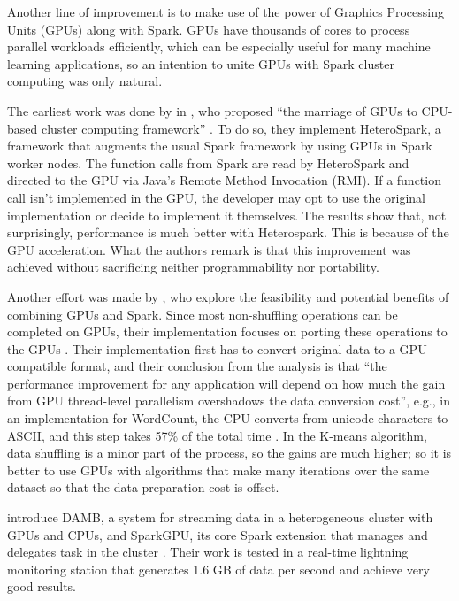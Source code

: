 \documentclass{article}
\begin{document}
Another line of improvement is to make use of the power of Graphics Processing Units (GPUs) along with Spark. GPUs have thousands of cores to process parallel workloads efficiently, which can be especially useful for many machine learning applications, so an intention to unite GPUs with Spark cluster computing was only natural.

The earliest work was done by \citeauthor{Li2015} in \citeyear{Li2015}, who proposed ``the marriage of GPUs to CPU-based cluster computing framework'' \cite{Li2015}. To do so, they implement HeteroSpark, a framework that augments the usual Spark framework by using GPUs in Spark worker nodes. The function calls from Spark are read by HeteroSpark and directed to the GPU via Java's Remote Method Invocation (RMI). If a function call isn't implemented in the GPU, the developer may opt to use the original implementation or decide to implement it themselves. The results show that, not surprisingly, performance is much better with Heterospark. This is because of the GPU acceleration. What the authors remark is that this improvement was achieved without sacrificing neither programmability nor portability.

Another effort was made by \citeauthor{Manzi2016}, who explore the feasibility and potential benefits of combining GPUs and Spark. Since most non-shuffling operations can be completed on GPUs, their implementation focuses on porting these operations to the GPUs \cite{Manzi2016}. Their implementation first has to convert original data to a GPU-compatible format, and their conclusion from the analysis is that ``the performance improvement for any application will depend on how much the gain from GPU thread-level parallelism overshadows the data conversion cost'', e.g., in an implementation for WordCount, the CPU converts from unicode characters to ASCII, and this step takes 57\% of the total time \cite{Manzi2016}. In the K-means algorithm, data shuffling is a minor part of the process, so the gains are much higher; so it is better to use GPUs with algorithms that make many iterations over the same dataset so that the data preparation cost is offset.

\citeauthor{Hassaan2016} introduce DAMB, a system for streaming data in a heterogeneous cluster with GPUs and CPUs, and SparkGPU, its core Spark extension that manages and delegates task in the cluster \cite{Hassaan2016}. Their work is tested in a real-time lightning monitoring station that generates 1.6 GB of data per second and achieve very good results. 
\end{document}
